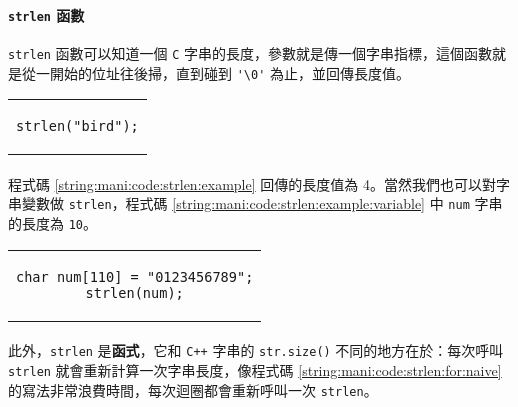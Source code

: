 \documentclass[12pt,a4paper,oneside]{article}
\begin{document}
\begin{CJK}{UTF8}{bkai}
\paragraph{\lstinline!strlen! 函數}\lstinline!strlen! 函數可以知道一個 \texttt{C} 字串的長度，參數就是傳一個字串指標，這個函數就是從一開始的位址往後掃，直到碰到 \lstinline!'\0'! 為止，並回傳長度值。

\begin{code}[h!]
  \centering
  \begin{tabular}{c}
  \begin{lstlisting}
strlen("bird");
  \end{lstlisting}
  \end{tabular}
  \caption{\lstinline!strlen! 範例}
  \label{string:mani:code:strlen:example}
\end{code}

\paragraph{}程式碼 \ref{string:mani:code:strlen:example} 回傳的長度值為 4。當然我們也可以對字串變數做 \lstinline!strlen!，程式碼 \ref{string:mani:code:strlen:example:variable} 中 \lstinline!num! 字串的長度為 \lstinline!10!。

\begin{code}[h!]
  \centering
  \begin{tabular}{c}
  \begin{lstlisting}
char num[110] = "0123456789";
strlen(num);
  \end{lstlisting}
  \end{tabular}
  \caption{\lstinline!strlen! 範例}
  \label{string:mani:code:strlen:example:variable}
\end{code}

\paragraph{}此外，\lstinline!strlen! 是{\color{blue}\textbf{函式}}，它和 \texttt{C++} 字串的 \lstinline!str.size()! 不同的地方在於：每次呼叫 \lstinline!strlen! 就會重新計算一次字串長度，像程式碼 \ref{string:mani:code:strlen:for:naive} 的寫法非常浪費時間，每次迴圈都會重新呼叫一次 \lstinline!strlen!。


\end{CJK}
\end{document}
